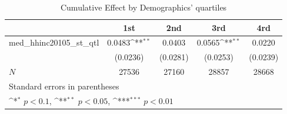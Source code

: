 \begin{table}[htbp]\centering
\def\sym#1{\ifmmode^{#1}\else\(^{#1}\)\fi}
\caption{Cumulative Effect by Demographics' quartiles}
\begin{tabular}{l*{4}{c}}
\hline\hline
            &\multicolumn{1}{c}{1st}&\multicolumn{1}{c}{2nd}&\multicolumn{1}{c}{3rd}&\multicolumn{1}{c}{4rd}\\
\hline
med\_hhinc20105\_st\_qtl&      0.0483\sym{**} &      0.0403         &      0.0565\sym{**} &      0.0220         \\
            &    (0.0236)         &    (0.0281)         &    (0.0253)         &    (0.0239)         \\
\hline
\(N\)       &       27536         &       27160         &       28857         &       28668         \\
\hline\hline
\multicolumn{5}{l}{\footnotesize Standard errors in parentheses}\\
\multicolumn{5}{l}{\footnotesize \sym{*} \(p<0.1\), \sym{**} \(p<0.05\), \sym{***} \(p<0.01\)}\\
\end{tabular}
\end{table}
